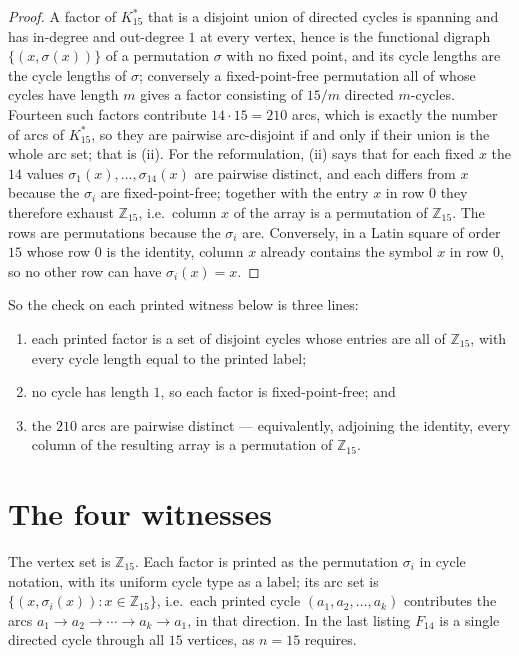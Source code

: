 \documentclass[11pt]{amsart}
\theoremstyle{remark}
\newcommand{\Kstar}{K^{*}}
\newcommand{\Zfif}{\mathbb{Z}_{15}}
\begin{document}
\begin{proof}
A factor of $\Kstar_{15}$ that is a disjoint union of directed cycles is
spanning and has in-degree and out-degree $1$ at every vertex, hence is the
functional digraph $\{(x,\sigma(x))\}$ of a permutation $\sigma$ with no fixed
point, and its cycle lengths are the cycle lengths of $\sigma$; conversely a
fixed-point-free permutation all of whose cycles have length $m$ gives a factor
consisting of $15/m$ directed $m$-cycles. Fourteen such factors contribute
$14 \cdot 15 = 210$ arcs, which is exactly the number of arcs of $\Kstar_{15}$,
so they are pairwise arc-disjoint if and only if their union is the whole arc
set; that is (ii). For the reformulation, (ii) says that for each fixed $x$ the
$14$ values $\sigma_{1}(x),\dots,\sigma_{14}(x)$ are pairwise distinct, and each
differs from $x$ because the $\sigma_{i}$ are fixed-point-free; together with the
entry $x$ in row $0$ they therefore exhaust $\Zfif$, i.e.\ column $x$ of the
array is a permutation of $\Zfif$. The rows are permutations because the
$\sigma_{i}$ are. Conversely, in a Latin square of order $15$ whose row $0$ is
the identity, column $x$ already contains the symbol $x$ in row $0$, so no other
row can have $\sigma_{i}(x)=x$.
\end{proof}

So the check on each printed witness below is three lines:
\begin{enumerate}
\item[(a)] each printed factor is a set of disjoint cycles whose entries are all
of $\Zfif$, with every cycle length equal to the printed label;
\item[(b)] no cycle has length $1$, so each factor is fixed-point-free; and
\item[(c)] the $210$ arcs are pairwise distinct --- equivalently, adjoining the
identity, every column of the resulting array is a permutation of $\Zfif$.
\end{enumerate}

\section{The four witnesses}\label{sec:witnesses}

The vertex set is $\Zfif$. Each factor is printed as the permutation
$\sigma_{i}$ in cycle notation, with its uniform cycle type as a label; its arc
set is $\{(x,\sigma_{i}(x)) : x \in \Zfif\}$, i.e.\ each printed cycle
$(a_{1},a_{2},\dots,a_{k})$ contributes the arcs $a_{1}\to a_{2} \to \cdots \to
a_{k} \to a_{1}$, in that direction. In the last listing $F_{14}$ is a single
directed cycle
through all $15$ vertices, as $n=15$ requires.
\end{document}
